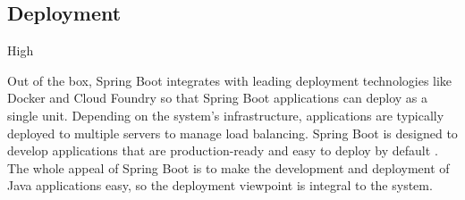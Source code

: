 \subsection*{Deployment}

\ranking High

Out of the box, Spring Boot integrates with leading deployment technologies like Docker and Cloud Foundry so that Spring Boot applications can deploy as a single unit. Depending on the system's infrastructure, applications are typically deployed to multiple servers to manage load balancing. Spring Boot is designed to develop applications that are production-ready and easy to deploy by default \cite{springBootDeployment}. The whole appeal of Spring Boot is to make the development and deployment of Java applications easy, so the deployment viewpoint is integral to the system.